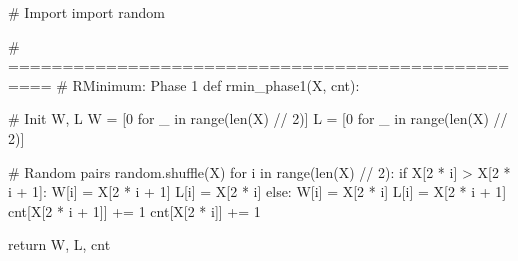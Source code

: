 \begin{python}
#   Import
import random

# ==================================================
#   RMinimum: Phase 1
def rmin_phase1(X, cnt):

    # Init W, L
    W = [0 for _ in range(len(X) // 2)]
    L = [0 for _ in range(len(X) // 2)]

    # Random pairs
    random.shuffle(X)
    for i in range(len(X) // 2):
        if X[2 * i] > X[2 * i + 1]:
            W[i] = X[2 * i + 1]
            L[i] = X[2 * i]
        else:
            W[i] = X[2 * i]
            L[i] = X[2 * i + 1]
        cnt[X[2 * i + 1]] += 1
        cnt[X[2 * i]] += 1

    return W, L, cnt
\end{python}